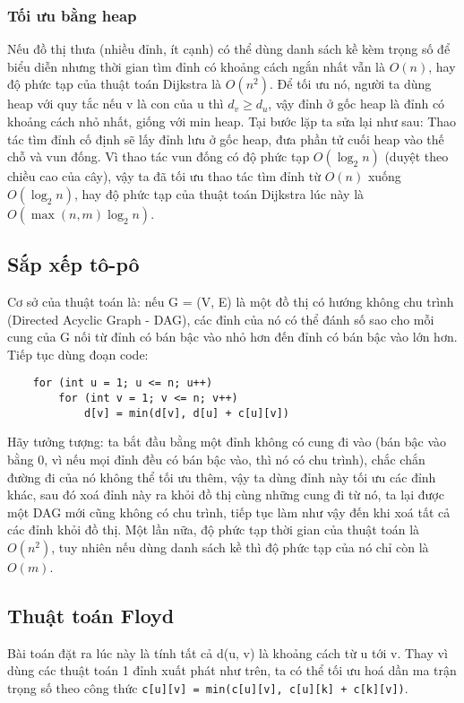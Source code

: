 \subsubsection{Tối ưu bằng heap}
Nếu đồ thị thưa (nhiều đỉnh, ít cạnh) có thể dùng danh sách kề kèm trọng số để biểu diễn nhưng thời gian tìm đỉnh có khoảng cách ngắn nhất vẫn là $O(n)$, hay độ phức tạp của thuật toán Dijkstra là $O(n^2)$. Để tối ưu nó, người ta dùng heap với quy tắc nếu v là con của u thì $d_v\geq d_u$, vậy đỉnh ở gốc heap là đỉnh có khoảng cách nhỏ nhất, giống với min heap. Tại bước lặp ta sửa lại như sau: Thao tác tìm đỉnh cố định sẽ lấy đỉnh lưu ở gốc heap, đưa phần tử cuối heap vào thế chỗ và vun đống. Vì thao tác vun đống có độ phức tạp $O(\log_2 n)$ (duyệt theo chiều cao của cây), vậy ta đã tối ưu thao tác tìm đỉnh từ $O(n)$ xuống $O(\log_2 n)$, hay độ phức tạp của thuật toán Dijkstra lúc này là $O(\max(n,m)\log_2 n)$.

\subsection{Sắp xếp tô-pô}
Cơ sở của thuật toán là: nếu G = (V, E) là một đồ thị có hướng không chu trình (Directed Acyclic Graph - DAG), các đỉnh của nó có thể đánh số sao cho mỗi cung của G nối từ đỉnh có bán bậc vào nhỏ hơn đến đỉnh có bán bậc vào lớn hơn. Tiếp tục dùng đoạn code:
\begin{verbatim}
    for (int u = 1; u <= n; u++)
        for (int v = 1; v <= n; v++)
            d[v] = min(d[v], d[u] + c[u][v])
\end{verbatim}
Hãy tưởng tượng: ta bắt đầu bằng một đỉnh không có cung đi vào (bán bậc vào bằng 0, vì nếu mọi đỉnh đều có bán bậc vào, thì nó có chu trình), chắc chắn đường đi của nó không thể tối ưu thêm, vậy ta dùng đỉnh này tối ưu các đỉnh khác, sau đó xoá đỉnh này ra khỏi đồ thị cùng những cung đi từ nó, ta lại được một DAG mới cũng không có chu trình, tiếp tục làm như vậy đến khi xoá tất cả các đỉnh khỏi đồ thị. Một lần nữa, độ phức tạp thời gian của thuật toán là $O(n^2)$, tuy nhiên nếu dùng danh sách kề thì độ phức tạp của nó chỉ còn là $O(m)$.

\subsection{Thuật toán Floyd}
Bài toán đặt ra lúc này là tính tất cả d(u, v) là khoảng cách từ u tới v. Thay vì dùng các thuật toán 1 đỉnh xuất phát như trên, ta có thể tối ưu hoá dần ma trận trọng số theo công thức \texttt{c[u][v] = min(c[u][v], c[u][k] + c[k][v])}.

